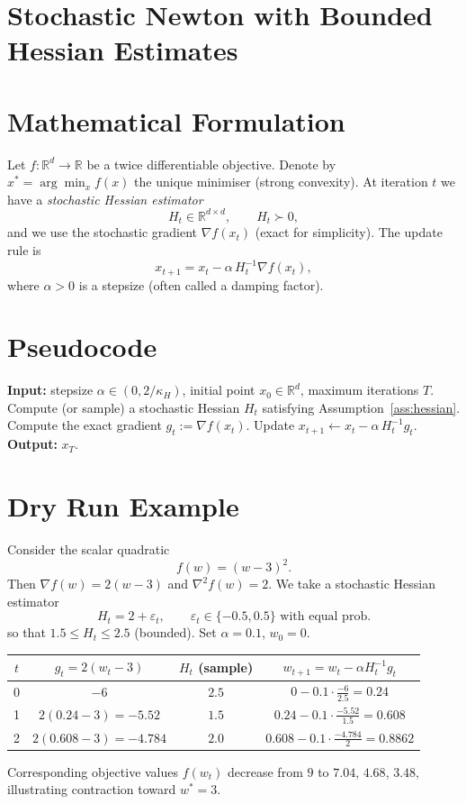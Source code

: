 \documentclass{article}
\newcommand{\R}{\mathbb{R}}
\begin{document}
\section*{Stochastic Newton with Bounded Hessian Estimates}

\section*{Mathematical Formulation}
Let $f:\R^{d}\rightarrow\R$ be a twice differentiable objective.  
Denote by $x^{*}=\arg\min_{x}f(x)$ the unique minimiser (strong convexity).  
At iteration $t$ we have a \emph{stochastic Hessian estimator}
\[
H_{t}\in\R^{d\times d},\qquad H_{t}\succ0,
\]
and we use the stochastic gradient $\nabla f(x_{t})$ (exact for simplicity).  
The update rule is
\begin{equation}
\boxed{x_{t+1}=x_{t}-\alpha\,H_{t}^{-1}\nabla f(x_{t})},
\label{eq:update}
\end{equation}
where $\alpha>0$ is a stepsize (often called a damping factor).  

\section*{Pseudocode}
\begin{algorithm}[H]
\caption{Stochastic Newton with Bounded Hessian Estimates}
\begin{algorithmic}[1]
\STATE \textbf{Input:} stepsize $\alpha\in(0,2/\kappa_{H})$, 
initial point $x_{0}\in\R^{d}$, maximum iterations $T$.
\STATE Compute (or sample) a stochastic Hessian $H_{t}$ satisfying Assumption~\ref{ass:hessian}.
\STATE Compute the exact gradient $g_{t}:=\nabla f(x_{t})$.
\STATE Update $x_{t+1}\gets x_{t}-\alpha\,H_{t}^{-1}g_{t}$.
\ENDFOR
\STATE \textbf{Output:} $x_{T}$.
\end{algorithmic}
\end{algorithm}

\section*{Dry Run Example}
Consider the scalar quadratic 
\[
f(w)=(w-3)^{2}.
\]
Then $\nabla f(w)=2(w-3)$ and $\nabla^{2}f(w)=2$.
We take a stochastic Hessian estimator
\[
H_{t}=2+\varepsilon_{t},\qquad \varepsilon_{t}\in\{-0.5,0.5\}\text{ with equal prob.}
\]
so that $1.5\le H_{t}\le2.5$ (bounded).  
Set $\alpha=0.1$, $w_{0}=0$.

\begin{center}
\begin{tabular}{c|c|c|c}
$t$ & $g_{t}=2(w_{t}-3)$ & $H_{t}$ (sample) & $w_{t+1}=w_{t}-\alpha H_{t}^{-1}g_{t}$ \\ \hline
0 & $-6$ & $2.5$ & $0-0.1\cdot\frac{-6}{2.5}=0.24$ \\ 
1 & $2(0.24-3)=-5.52$ & $1.5$ & $0.24-0.1\cdot\frac{-5.52}{1.5}=0.608$ \\ 
2 & $2(0.608-3)=-4.784$ & $2.0$ & $0.608-0.1\cdot\frac{-4.784}{2}=0.8862$ 
\end{tabular}
\end{center}
Corresponding objective values $f(w_{t})$ decrease from $9$ to $7.04$, $4.68$, $3.48$, illustrating contraction toward $w^{*}=3$.
\end{document}
